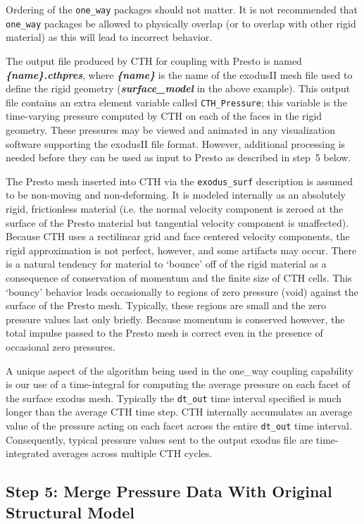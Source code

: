 \documentclass[11pt,twoside]{article}
\newcommand{\cmd}[1]
   {\mbox{\tt #1}\null}
\newcommand{\file}[1]
   {\mbox{\bf\em #1}\null}
\newcommand{\param}[1]
   {\mbox{\{\em #1\}}\null}
\begin{document}
Ordering of the \cmd{one\_way} packages should not matter.  It is not
recommended that \cmd{one\_way} packages be allowed to physically
overlap (or to overlap with other rigid material) as this will lead to
incorrect behavior.


The output file produced by CTH for coupling with Presto is named
\file{\param{name}.cthpres}, where \file{\param{name}} is the name of
the exodusII mesh file used to define the rigid geometry
(\file{surface\_model} in the above example).  This output file
contains an extra element variable called \cmd{CTH\_Pressure}; this
variable is the time{}-varying pressure computed by CTH on each of the
faces in the rigid geometry.  These pressures may be viewed and
animated in any visualization software supporting the exodusII file
format.  However, additional processing is needed before they can be
used as input to Presto as described in step~5 below.

The Presto mesh inserted into CTH via the \cmd{exodus\_surf} description is
assumed to be non{}-moving and non{}-deforming.  It is modeled
internally as an absolutely rigid, frictionless material (i.e. the
normal velocity component is zeroed at the surface of the Presto
material but tangential velocity component is unaffected).  Because
CTH uses a rectilinear grid and face centered velocity components, the
rigid approximation is not perfect, however, and some artifacts may
occur. There is a natural tendency for material to `bounce' off of the
rigid material as a consequence of conservation of momentum and the
finite size of CTH cells.  This `bouncy' behavior leads occasionally
to regions of zero pressure (void) against the surface of the Presto
mesh.  Typically, these regions are small and the zero pressure values
last only briefly.  Because momentum is conserved however, the total
impulse passed to the Presto mesh is correct even in the presence of
occasional zero pressures.

A unique aspect of the algorithm being used in the one\_way coupling
capability is our use of a time{}-integral for computing the average
pressure on each facet of the surface exodus mesh.  Typically the
\cmd{dt\_out} time interval specified is much longer than the average CTH
time step.  CTH internally accumulates an average value of the
pressure acting on each facet across the entire \cmd{dt\_out} time
interval.  Consequently, typical pressure values sent to the output
exodus file are time{}-integrated averages across multiple CTH cycles.

\subsection{Step 5:  Merge Pressure Data With Original Structural Model}
\end{document}
